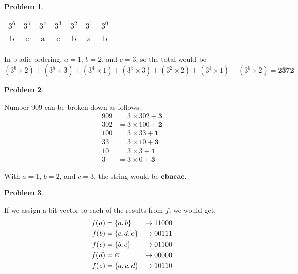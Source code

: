 \documentclass[11pt]{article}
\theoremstyle{definition}
\theoremstyle{case}
\theoremstyle{theorem}
\newtheorem{prob}{Problem}
\begin{document}
\begin{prob}\end{prob}

\begin{tabular}{|c|c|c|c|c|c|c|}
$3^6$ & $3^5$ & $3^4$ & $3^3$ & $3^2$ & $3^1$ & $3^0$ \\
b & c & a & c & b & a & b
\end{tabular}

\vspace{15px}

In b-adic ordering, $a = 1$, $b = 2$, and $c = 3$, so the total would be 
$$(3^6 \times 2) + (3^5 \times 3) + (3^4 \times 1) + (3^3 \times 3) + (3^2 \times 2) + (3^1 \times 1) + (3^0 \times 2) = \textbf{2372}$$

\begin{prob}\end{prob}

Number 909 can be broken down as follows:
\begin{align*}
909 &= 3 \times 302 + \textbf{3} \\
302 &= 3 \times 100 + \textbf{2} \\
100 &= 3 \times 33 + \textbf{1} \\
33  &= 3 \times 10 + \textbf{3} \\
10  &= 3 \times 3 + \textbf{1} \\
3   &= 3 \times 0 + \textbf{3}
\end{align*}

With $a = 1$, $b = 2$, and $c = 3$, the string would be $\textbf{cbacac}$. \\

\newpage

\begin{prob}\end{prob}

If we assign a bit vector to each of the results from $f$, we would get:
\begin{align*}
f(a) &= \{a, b\} &\rightarrow 1 \space 1 \space 0 \space 0 \space 0 \\
f(b) &= \{c, d, e\} &\rightarrow 0 \space 0 \space 1 \space 1 \space 1 \\
f(c) &= \{b, c\} &\rightarrow 0 \space 1 \space 1 \space 0 \space 0 \\
f(d) &= \varnothing &\rightarrow 0 \space 0 \space 0 \space 0 \space 0 \\
f(e) &= \{a, c, d\} &\rightarrow 1 \space 0 \space 1 \space 1 \space 0
\end{align*}
\end{document}
